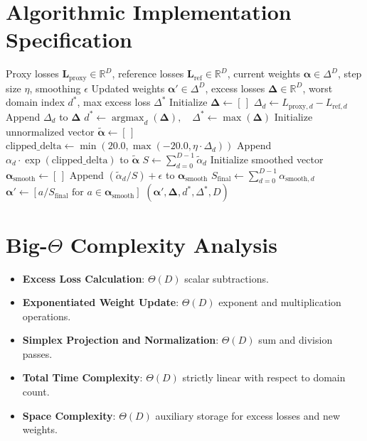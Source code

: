 \documentclass[11pt,a4paper]{article}
\theoremstyle{definition}
\begin{document}
\section{Algorithmic Implementation Specification}

\begin{algorithm}[H]
\caption{DoReMi Dynamic Domain Reweighting}
\begin{algorithmic}[1]
\Require Proxy losses $\mathbf{L}_{\text{proxy}} \in \mathbb{R}^D$, reference losses $\mathbf{L}_{\text{ref}} \in \mathbb{R}^D$, current weights $\boldsymbol{\alpha} \in \Delta^D$, step size $\eta$, smoothing $\epsilon$
\Ensure Updated weights $\boldsymbol{\alpha}' \in \Delta^D$, excess losses $\boldsymbol{\Delta} \in \mathbb{R}^D$, worst domain index $d^*$, max excess loss $\Delta^*$
\State Initialize $\boldsymbol{\Delta} \gets [\,]$
    \State $\Delta_d \gets L_{\text{proxy}, d} - L_{\text{ref}, d}$
    \State Append $\Delta_d$ to $\boldsymbol{\Delta}$
\EndFor
\State $d^* \gets \operatorname{argmax}_d(\boldsymbol{\Delta}), \quad \Delta^* \gets \max(\boldsymbol{\Delta})$
\State Initialize unnormalized vector $\tilde{\boldsymbol{\alpha}} \gets [\,]$
    \State $\text{clipped\_delta} \gets \min(20.0, \max(-20.0, \eta \cdot \Delta_d))$
    \State Append $\alpha_d \cdot \exp(\text{clipped\_delta})$ to $\tilde{\boldsymbol{\alpha}}$
\EndFor
\State $S \gets \sum_{d=0}^{D-1} \tilde{\alpha}_d$
\State Initialize smoothed vector $\boldsymbol{\alpha}_{\text{smooth}} \gets [\,]$
    \State Append $(\tilde{\alpha}_d / S) + \epsilon$ to $\boldsymbol{\alpha}_{\text{smooth}}$
\EndFor
\State $S_{\text{final}} \gets \sum_{d=0}^{D-1} \alpha_{\text{smooth}, d}$
\State $\boldsymbol{\alpha}' \gets [ a / S_{\text{final}} \text{ for } a \in \boldsymbol{\alpha}_{\text{smooth}} ]$
\State \Return $(\boldsymbol{\alpha}', \boldsymbol{\Delta}, d^*, \Delta^*, D)$
\end{algorithmic}
\end{algorithm}

\section{Big-$\Theta$ Complexity Analysis}

\begin{itemize}
    \item \textbf{Excess Loss Calculation}: $\Theta(D)$ scalar subtractions.
    \item \textbf{Exponentiated Weight Update}: $\Theta(D)$ exponent and multiplication operations.
    \item \textbf{Simplex Projection and Normalization}: $\Theta(D)$ sum and division passes.
    \item \textbf{Total Time Complexity}: $\Theta(D)$ strictly linear with respect to domain count.
    \item \textbf{Space Complexity}: $\Theta(D)$ auxiliary storage for excess losses and new weights.
\end{itemize}
\end{document}
